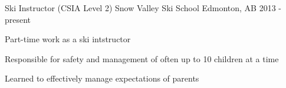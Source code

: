 \begin{cventries}
  \cventry
    {Ski Instructor (CSIA Level 2)} %
    {Snow Valley Ski School} %
    {Edmonton, AB} %
    {2013 - present} %
    {
      \begin{cvitems} %
      \item {Part-time work as a ski intstructor}
      \item {Responsible for safety and management of often up to 10 children at a time}
      \item {Learned to effectively manage expectations of parents}
      \end{cvitems}
    }
\end{cventries}
